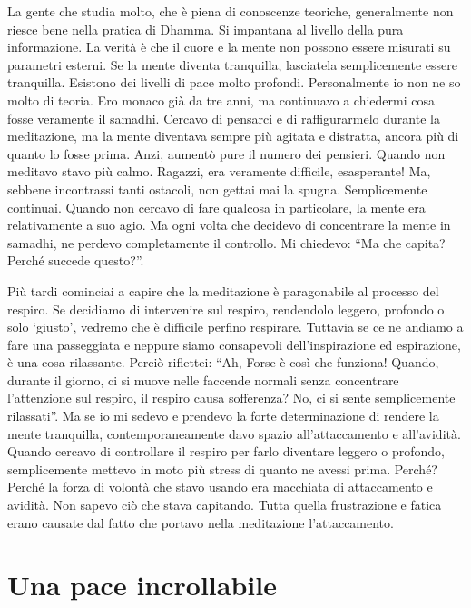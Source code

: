La gente che studia molto, che è piena di conoscenze teoriche,
generalmente non riesce bene nella pratica di Dhamma. Si impantana al
livello della pura informazione. La verità è che il cuore e la mente non
possono essere misurati su parametri esterni. Se la mente diventa
tranquilla, lasciatela semplicemente essere tranquilla. Esistono dei
livelli di pace molto profondi. Personalmente io non ne so molto di
teoria. Ero monaco già da tre anni, ma continuavo a chiedermi cosa fosse
veramente il samadhi. Cercavo di pensarci e di raffigurarmelo durante la
meditazione, ma la mente diventava sempre più agitata e distratta,
ancora più di quanto lo fosse prima. Anzi, aumentò pure il numero dei
pensieri. Quando non meditavo stavo più calmo. Ragazzi, era veramente
difficile, esasperante! Ma, sebbene incontrassi tanti ostacoli, non
gettai mai la spugna. Semplicemente continuai. Quando non cercavo di
fare qualcosa in particolare, la mente era relativamente a suo agio. Ma
ogni volta che decidevo di concentrare la mente in samadhi, ne perdevo
completamente il controllo. Mi chiedevo: ``Ma che capita? Perché succede
questo?''.

Più tardi cominciai a capire che la meditazione è paragonabile al
processo del respiro. Se decidiamo di intervenire sul respiro,
rendendolo leggero, profondo o solo `giusto', vedremo che è difficile
perfino respirare. Tuttavia se ce ne andiamo a fare una passeggiata e
neppure siamo consapevoli dell'inspirazione ed espirazione, è una cosa
rilassante. Perciò riflettei: ``Ah, Forse è così che funziona! Quando,
durante il giorno, ci si muove nelle faccende normali senza concentrare
l'attenzione sul respiro, il respiro causa sofferenza? No, ci si sente
semplicemente rilassati''. Ma se io mi sedevo e prendevo la forte
determinazione di rendere la mente tranquilla, contemporaneamente davo
spazio all'attaccamento e all'avidità. Quando cercavo di controllare il
respiro per farlo diventare leggero o profondo, semplicemente mettevo in
moto più stress di quanto ne avessi prima. Perché? Perché la forza di
volontà che stavo usando era macchiata di attaccamento e avidità. Non
sapevo ciò che stava capitando. Tutta quella frustrazione e fatica erano
causate dal fatto che portavo nella meditazione l'attaccamento.

\section{Una pace incrollabile}

